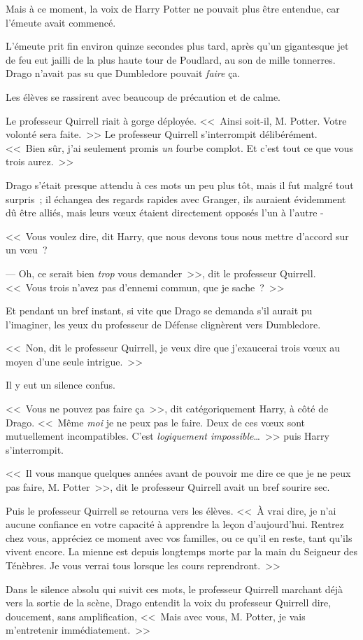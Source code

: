 Mais à ce moment, la voix de Harry Potter ne pouvait plus être entendue, car l'émeute avait commencé.

\later

L'émeute prit fin environ quinze secondes plus tard, après qu'un gigantesque jet de feu eut jailli de la plus haute tour de Poudlard, au son de mille tonnerres. Drago n'avait pas su que Dumbledore pouvait \emph{faire} ça.

Les élèves se rassirent avec beaucoup de précaution et de calme.

Le professeur Quirrell riait à gorge déployée. <<~Ainsi soit-il, M. Potter. Votre volonté sera faite.~>> Le professeur Quirrell s'interrompit délibérément. <<~Bien sûr, j'ai seulement promis \emph{un} fourbe complot. Et c'est tout ce que vous trois aurez.~>>

Drago s'était presque attendu à ces mots un peu plus tôt, mais il fut malgré tout surpris~; il échangea des regards rapides avec Granger, ils auraient évidemment dû être alliés, mais leurs vœux étaient directement opposés l'un à l'autre -

<<~Vous voulez dire, dit Harry, que nous devons tous nous mettre d'accord sur un vœu~?

--- Oh, ce serait bien \emph{trop} vous demander~>>, dit le professeur Quirrell. <<~Vous trois n'avez pas d'ennemi commun, que je sache~?~>>

Et pendant un bref instant, si vite que Drago se demanda s'il aurait pu l'imaginer, les yeux du professeur de Défense clignèrent vers Dumbledore.

<<~Non, dit le professeur Quirrell, je veux dire que j'exaucerai trois vœux au moyen d'une seule intrigue.~>>

Il y eut un silence confus.

<<~Vous ne pouvez pas faire ça~>>, dit catégoriquement Harry, à côté de Drago. <<~Même \emph{moi} je ne peux pas le faire. Deux de ces vœux sont mutuellement incompatibles. C'est \emph{logiquement impossible}…~>> puis Harry s'interrompit.

<<~Il vous manque quelques années avant de pouvoir me dire ce que je ne peux pas faire, M. Potter~>>, dit le professeur Quirrell avait un bref sourire sec.

Puis le professeur Quirrell se retourna vers les élèves. <<~À vrai dire, je n'ai aucune confiance en votre capacité à apprendre la leçon d'aujourd'hui. Rentrez chez vous, appréciez ce moment avec vos familles, ou ce qu'il en reste, tant qu'ils vivent encore. La mienne est depuis longtemps morte par la main du Seigneur des Ténèbres. Je vous verrai tous lorsque les cours reprendront.~>>

Dans le silence absolu qui suivit ces mots, le professeur Quirrell marchant déjà vers la sortie de la scène, Drago entendit la voix du professeur Quirrell dire, doucement, sans amplification, <<~Mais avec vous, M. Potter, je vais m'entretenir immédiatement.~>>

